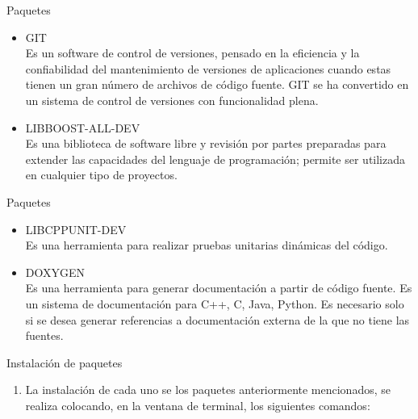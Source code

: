 \begin{frame}{Paquetes}
  \begin{itemize}
  \item {GIT\\}
  {Es un software de control de versiones, pensado en la eficiencia y la confiabilidad del mantenimiento de versiones de aplicaciones cuando estas tienen un gran n\'umero de archivos de c\'odigo fuente. GIT se ha convertido en un sistema de control de versiones con funcionalidad plena.}
  \item {LIBBOOST-ALL-DEV\\}
  {Es una biblioteca de software libre y revisi\'on por partes preparadas para extender las capacidades del lenguaje de programaci\'on; permite ser utilizada en cualquier tipo de proyectos.}
  \end{itemize}
\end{frame}


\begin{frame}{Paquetes}
  \begin{itemize}
  \item {LIBCPPUNIT-DEV\\}
  {Es una herramienta para realizar pruebas unitarias  din\'amicas del c\'odigo.}
  \item {DOXYGEN\\}
  {Es una herramienta para generar documentaci\'on a partir de c\'odigo fuente. Es un sistema de documentaci\'on para C++, C, Java, Python. Es necesario solo si se desea generar referencias a documentaci\'on externa de la que no tiene las fuentes.}
  \end{itemize}
\end{frame}


\begin{frame}{Instalaci\'on de paquetes}
\begin{enumerate}[1.]
\item La instalaci\'on de cada uno se los paquetes anteriormente mencionados, se realiza colocando, en la ventana de terminal, los siguientes comandos:
\end{enumerate}



\end{frame}

